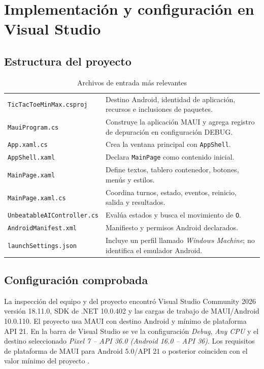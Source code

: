\chapter{Implementación y configuración en Visual Studio}
\section{Estructura del proyecto}
\begin{table}[H]
\centering
\caption{Archivos de entrada más relevantes}
\label{tab:files}
\begin{tabular}{P{4.8cm}P{10.0cm}}
\toprule
{} & \\
\midrule
\texttt{TicTacToeMinMax\allowbreak.csproj} & Destino Android, identidad de aplicación, recursos e inclusiones de paquetes.\\
\texttt{MauiProgram.cs} & Construye la aplicación MAUI y agrega registro de depuración en configuración DEBUG.\\
\texttt{App.xaml.cs} & Crea la ventana principal con \texttt{AppShell}.\\
\texttt{AppShell.xaml} & Declara \texttt{MainPage} como contenido inicial.\\
\texttt{MainPage.xaml} & Define textos, tablero contenedor, botones, menús y estilos.\\
\texttt{MainPage.xaml.cs} & Coordina turnos, estado, eventos, reinicio, salida y resultados.\\
\texttt{UnbeatableAI}\allowbreak\texttt{Controller.cs} & Evalúa estados y busca el movimiento de \texttt{O}.\\
\texttt{AndroidManifest.xml} & Manifiesto y permisos Android declarados.\\
\texttt{launchSettings.json} & Incluye un perfil llamado \emph{Windows Machine}; no identifica el emulador Android.\\
\bottomrule
\end{tabular}
\end{table}

\section{Configuración comprobada}
La inspección del equipo y del proyecto encontró Visual Studio Community 2026 versión 18.11.0, SDK de .NET 10.0.402 y las cargas de trabajo de MAUI/Android 10.0.110. El proyecto usa MAUI con destino Android y mínimo de plataforma API 21. En la barra de Visual Studio se ve la configuración \emph{Debug}, \emph{Any CPU} y el destino seleccionado \emph{Pixel 7 -- API 36.0 (Android 16.0 -- API 36)}. Los requisitos de plataforma de MAUI para Android 5.0/API 21 o posterior coinciden con el valor mínimo del proyecto \cite{mauiPlatforms}.

